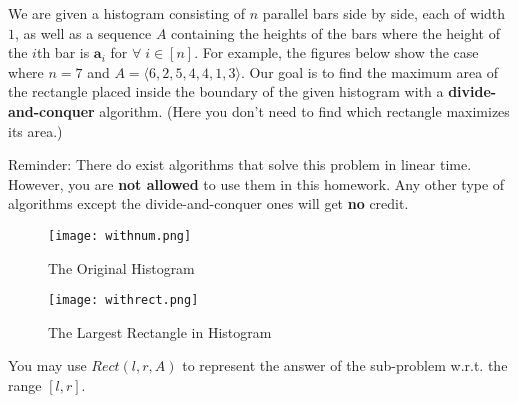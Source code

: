 
We are given a histogram consisting of $n$ parallel bars side by side, each of width $1$, as well as a sequence $A$ containing the heights of the bars where the height of the $i$th bar is $\mathbf{a}_i$ for $\forall \; i \in [n]$. For example, the figures below show the case where $n= 7$ and $A = \langle 6, 2, 5, 4, 4, 1, 3 \rangle$. Our goal is to find the maximum area of the rectangle placed inside the boundary of the given histogram with a \textbf{divide-and-conquer} algorithm. (Here you don't need to find which rectangle maximizes its area.)

Reminder: There do exist algorithms that solve this problem in linear time. However, you are \textbf{not allowed} to use them in this homework. Any other type of algorithms except the divide-and-conquer ones will get \textbf{no} credit.

\begin{figure}[htbp]
    \centering
    \begin{minipage}[t]{0.48\textwidth}
        \centering
        \texttt{[image: withnum.png]}
        \caption{The Original Histogram}
    \end{minipage}
    \begin{minipage}[t]{0.48\textwidth}
        \centering
        \texttt{[image: withrect.png]}
        \caption{The Largest Rectangle in Histogram}
    \end{minipage}
\end{figure}

You may use $Rect(l, r, A)$ to represent the answer of the sub-problem w.r.t. the range $\left[l, r\right]$.

